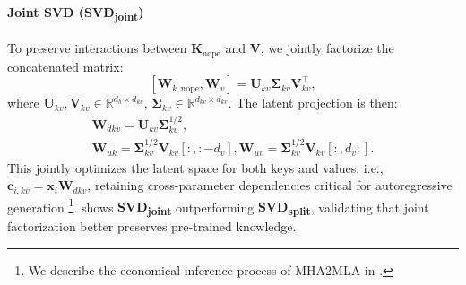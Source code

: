 \paragraph{Joint SVD (SVD\textsubscript{joint})}  
To preserve interactions between \(\bm{K}_{\text{nope}}\) and \(\bm{V}\), we jointly factorize the concatenated matrix:  
\[
[\bm{W}_{k,\text{nope}}, \bm{W}_v] = \bm{U}_{kv} \bm{\Sigma}_{kv} \bm{V}_{kv}^\top,
\]  
where \(\bm{U}_{kv},\bm{V}_{kv} \in \mathbb{R}^{d_h \times d_{kv}}\), \(\bm{\Sigma}_{kv} \in \mathbb{R}^{d_{kv} \times d_{kv}}\). The latent projection is then:  
\begin{gather*}
\bm{W}_{dkv} = \bm{U}_{kv} \bm{\Sigma}_{kv}^{1/2}, \\ 
\bm{W}_{uk}\!=\!\bm{\Sigma}_{kv}^{1/2} \bm{V}_{kv}[:, :-d_v], \bm{W}_{uv}\!=\!\bm{\Sigma}_{kv}^{1/2} \bm{V}_{kv}[:, d_v:].    
\end{gather*}
This jointly optimizes the latent space for both keys and values, i.e., $\bm{c}_{i,kv} = \bm{x}_i \bm{W}_{dkv}$, retaining cross-parameter dependencies critical for autoregressive generation
\footnote{
We describe the economical inference process of MHA2MLA in .
}.  
 shows \textbf{SVD\textsubscript{joint}} outperforming \textbf{SVD\textsubscript{split}}, validating that joint factorization better preserves pre-trained knowledge.  

